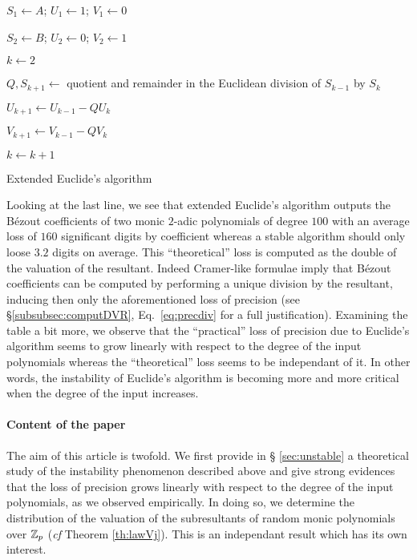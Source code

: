 \documentclass{article}
\begin{document}
%
\begin{algorithm}

  \BlankLine

  $S_1 \leftarrow A$; $U_1 \leftarrow 1$; $V_1 \leftarrow 0$

  $S_2 \leftarrow B$; $U_2 \leftarrow 0$; $V_2 \leftarrow 1$

  $k \leftarrow 2$

    {$Q, S_{k+1} \leftarrow$ quotient and remainder in the Euclidean
     division of $S_{k-1}$ by $S_k$

     $U_{k+1} \leftarrow U_{k-1} - Q U_k$

     $V_{k+1} \leftarrow V_{k-1} - Q V_k$

     $k \leftarrow k+1$}

\caption{Extended Euclide's algorithm}
\label{algo:Euclide}
\end{algorithm}
%
Looking at the last line, we see that 
extended Euclide's algorithm outputs the B\'ezout coefficients of two 
monic $2$-adic polynomials of degree $100$ with an average loss of 
$160$ significant digits by coefficient whereas a stable 
algorithm should only loose $3.2$ digits on average. This 
``theoretical'' loss is computed as the double of the valuation of the 
resultant. Indeed Cramer-like formulae imply that B\'ezout coefficients 
can be computed by performing a unique division by the resultant, 
inducing then only the aforementioned loss of precision (see 
\S \ref{subsubsec:computDVR}, Eq.~\eqref{eq:precdiv} for a full
justification). Examining the 
table a bit more, we observe that the ``practical'' loss of 
precision due to Euclide's algorithm seems to grow linearly with respect 
to the degree of the input polynomials whereas the ``theoretical'' loss 
seems to be independant of it. In other words, the instability of 
Euclide's algorithm is becoming more and more critical when the degree 
of the input increases.

\paragraph{Content of the paper}

The aim of this article is twofold. We first provide in \S 
\ref{sec:unstable} a theoretical study of the instability phenomenon 
described above and give strong evidences that the loss of precision 
grows linearly with respect to the degree of the input polynomials, as we 
observed empirically. In doing so, we determine the distribution of the 
valuation of the subresultants of random monic polynomials over $\mathbb Z_p$ 
(\emph{cf} Theorem \ref{th:lawVj}). This is an independant result which 
has its own interest.
\end{document}

